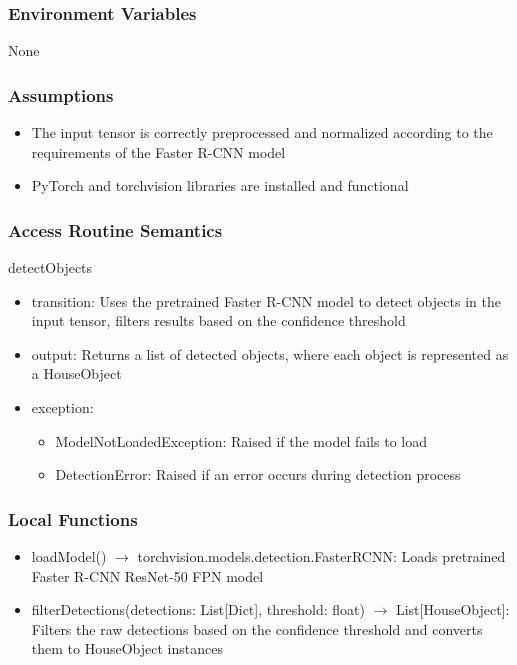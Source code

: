 \documentclass[12pt, titlepage]{article}
\begin{document}
\subsubsection{Environment Variables}
None

\subsubsection{Assumptions}
\begin{itemize}
  \item The input tensor is correctly preprocessed and normalized according to the requirements of the Faster R-CNN model
  \item PyTorch and torchvision libraries are installed and functional
\end{itemize}


\subsubsection{Access Routine Semantics}

\noindent detectObjects
\begin{itemize}
\item transition: Uses the pretrained Faster R-CNN model to detect objects in the input tensor, filters results based on the confidence threshold
\item output: Returns a list of detected objects, where each object is represented as a HouseObject
\item exception: 
\begin{itemize}
  \item ModelNotLoadedException: Raised if the model fails to load
  \item DetectionError: Raised if an error occurs during detection process
\end{itemize}

\end{itemize}


\subsubsection{Local Functions}

\begin{itemize}
  \item loadModel() $\rightarrow$ torchvision.models.detection.FasterRCNN: Loads pretrained Faster R-CNN ResNet-50 FPN model
  \item filterDetections(detections: List[Dict], threshold: float) $\rightarrow$ List[HouseObject]: Filters the raw detections based on the confidence threshold and converts them to HouseObject instances
\end{itemize}
\end{document}
